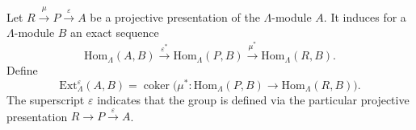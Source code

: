 Let $R \xrightarrow{\mu} P \xrightarrow{\varepsilon} A$ be a projective presentation of the $\Lambda$-module $A$. It induces for a $\Lambda$-module $B$ an exact sequence
$$\text{Hom}_\Lambda(A, B) \xrightarrow{\varepsilon^*} \text{Hom}_\Lambda(P, B) \xrightarrow{\mu^*} \text{Hom}_\Lambda(R, B).$$
Define
$$\text{Ext}_\Lambda^\varepsilon(A, B) = \operatorname{coker}\!\big(\mu^* : \text{Hom}_\Lambda(P, B) \rightarrow \text{Hom}_\Lambda(R, B)\big).$$
The superscript $\varepsilon$ indicates that the group is defined via the particular projective presentation $R \to P \xrightarrow{\varepsilon} A$.
